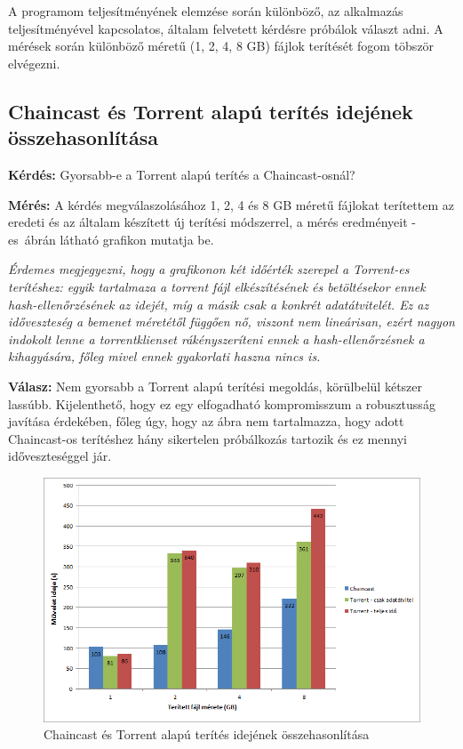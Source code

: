 A programom teljesítményének elemzése során különböző, az alkalmazás teljesítményével kapcsolatos, általam felvetett kérdésre próbálok választ adni. A mérések során különböző méretű (1, 2, 4, 8 GB) fájlok terítését fogom töbször elvégezni.

%
\subsection{Chaincast és Torrent alapú terítés idejének összehasonlítása}
%
\textbf{Kérdés:} Gyorsabb-e a Torrent alapú terítés a Chaincast-osnál?

\textbf{Mérés:} A kérdés megválaszolásához 1, 2, 4 és 8 GB méretű fájlokat terítettem az eredeti és az általam készített új terítési módszerrel, a mérés eredményeit  -es~ábrán látható grafikon mutatja be.


\textit{Érdemes megjegyezni, hogy a grafikonon két időérték szerepel a Torrent-es terítéshez: egyik tartalmaza a torrent fájl elkészítésének és betöltésekor ennek hash-ellenőrzésének az idejét, míg a másik csak a konkrét adatátvitelét. Ez az időveszteség a bemenet méretétől függően nő, viszont nem lineárisan, ezért nagyon indokolt lenne a torrentklienset rákényszeríteni ennek a hash-ellenőrzésnek a kihagyására, főleg mivel ennek gyakorlati haszna nincs is.}

\textbf{Válasz:} Nem gyorsabb a Torrent alapú terítési megoldás, körülbelül kétszer lassúbb. Kijelenthető, hogy ez egy elfogadható kompromisszum a robusztusság javítása érdekében, főleg úgy, hogy az ábra nem tartalmazza, hogy adott Chaincast-os terítéshez hány sikertelen próbálkozás tartozik és ez mennyi időveszteséggel jár. 

\begin{figure}[ht]
\centering
\includegraphics[width=150mm, keepaspectratio]{figures/Perf_chaincast_torrent_comparison.png}
\caption{Chaincast és Torrent alapú terítés idejének összehasonlítása}
\label{fig:chaincasttorrrentcomparison}
\end{figure}


